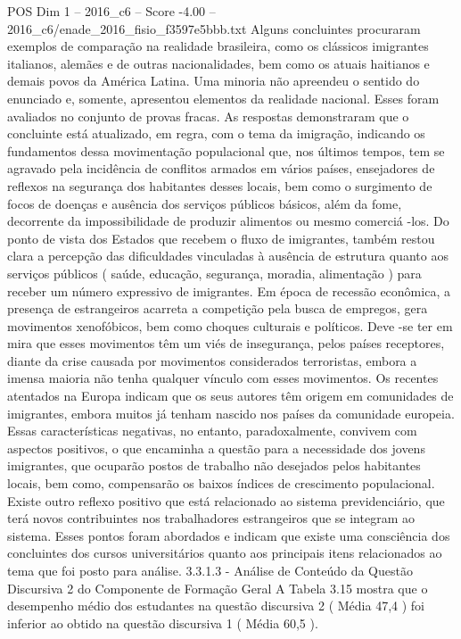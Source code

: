 \begin{textsample}{POS Dim 1 – 2016\_c6 – Score -4.00 – 2016\_c6/enade\_2016\_fisio\_f3597e5bbb.txt}
Alguns concluintes procuraram exemplos de comparação na realidade brasileira, como os clássicos imigrantes italianos, alemães e de outras nacionalidades, bem como os atuais haitianos e demais povos da América Latina.
Uma minoria não apreendeu o sentido do enunciado e, somente, apresentou elementos da realidade nacional.
Esses foram avaliados no conjunto de provas fracas.
As respostas demonstraram que o concluinte está atualizado, em regra, com o tema da imigração, indicando os fundamentos dessa movimentação populacional que, nos últimos tempos, tem se agravado pela incidência de conflitos armados em vários países, ensejadores de reflexos na segurança dos habitantes desses locais, bem como o surgimento de focos de doenças e ausência dos serviços públicos básicos, além da fome, decorrente da impossibilidade de produzir alimentos ou mesmo comerciá -los.
Do ponto de vista dos Estados que recebem o fluxo de imigrantes, também restou clara a percepção das dificuldades vinculadas à ausência de estrutura quanto aos serviços públicos ( saúde, educação, segurança, moradia, alimentação ) para receber um número expressivo de imigrantes.
Em época de recessão econômica, a presença de estrangeiros acarreta a competição pela busca de empregos, gera movimentos xenofóbicos, bem como choques culturais e políticos.
Deve -se ter em mira que esses movimentos têm um viés de insegurança, pelos países receptores, diante da crise causada por movimentos considerados terroristas, embora a imensa maioria não tenha qualquer vínculo com esses movimentos.
Os recentes atentados na Europa indicam que os seus autores têm origem em comunidades de imigrantes, embora muitos já tenham nascido nos países da comunidade europeia.
Essas características negativas, no entanto, paradoxalmente, convivem com aspectos positivos, o que encaminha a questão para a necessidade dos jovens imigrantes, que ocuparão postos de trabalho não desejados pelos habitantes locais, bem como, compensarão os baixos índices de crescimento populacional.
Existe outro reflexo positivo que está relacionado ao sistema previdenciário, que terá novos contribuintes nos trabalhadores estrangeiros que se integram ao sistema.
Esses pontos foram abordados e indicam que existe uma consciência dos concluintes dos cursos universitários quanto aos principais itens relacionados ao tema que foi posto para análise. 3.3.1.3 - Análise de Conteúdo da Questão Discursiva 2 do Componente de Formação Geral A Tabela 3.15 mostra que o desempenho médio dos estudantes na questão discursiva 2 ( Média 47,4 ) foi inferior ao obtido na questão discursiva 1 ( Média 60,5 ).

\end{textsample}
